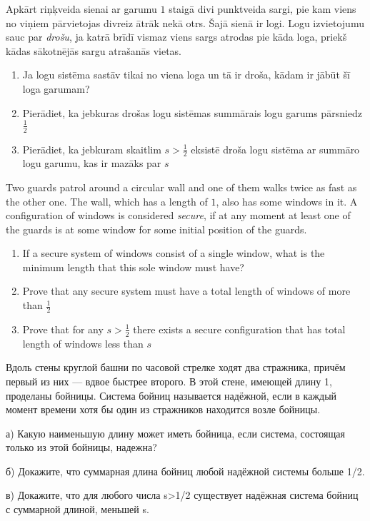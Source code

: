 \begin{problem}
Apkārt riņķveida sienai ar garumu $1$ staigā divi punktveida sargi, pie kam viens no viņiem pārvietojas divreiz ātrāk nekā otrs. Šajā sienā ir logi. Logu izvietojumu sauc par \textit{drošu}, ja katrā brīdī vismaz viens sargs atrodas pie kāda loga, priekš kādas sākotnējās sargu atrašanās vietas. 
\begin {enumerate}
\item Ja logu sistēma sastāv tikai no viena loga un tā ir droša, kādam ir jābūt šī loga garumam?
\item Pierādiet, ka jebkuras drošas logu sistēmas summārais logu garums pārsniedz $\frac{1}{2}$
\item Pierādiet, ka jebkuram skaitlim $s>\frac{1}{2}$ eksistē droša logu sistēma ar summāro logu garumu, kas ir mazāks par $s$
\end {enumerate}

Two guards patrol around a circular wall and one of them walks twice as fast as the other one. The wall, which has a length of $1$, also has some windows in it. A configuration of windows is considered \textit{secure}, if at any moment at least one of the guards is at some window for some initial position of the guards.
\begin {enumerate}
\item If a secure system of windows consist of a single window, what is the minimum length that this sole window must have?
\item Prove that any secure system must have a total length of windows of more than $\frac{1}{2}$
\item Prove that for any $s>\frac{1}{2}$ there exists a secure configuration that has total length of windows less than $s$
\end {enumerate}




Вдоль стены круглой башни по часовой стрелке ходят два стражника, причём первый из них — вдвое быстрее второго. В этой стене, имеющей длину 1, проделаны бойницы. Система бойниц называется надёжной, если в каждый момент времени хотя бы один из стражников находится возле бойницы.

а) Какую наименьшую длину может иметь бойница, если система, состоящая только из этой бойницы, надежна?

б) Докажите, что суммарная длина бойниц любой надёжной системы больше 1/2.

в) Докажите, что для любого числа s>1/2 существует надёжная система бойниц с суммарной длиной, меньшей s.

\end{problem}



%


